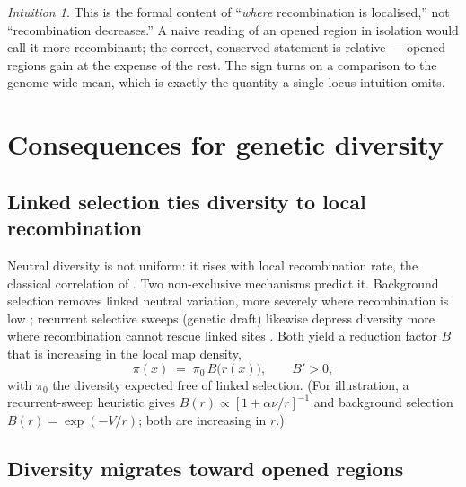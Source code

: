 \documentclass[11pt]{article}
\theoremstyle{remark}
\newtheorem*{remark}{Intuition}
\begin{document}
\begin{remark}
This is the formal content of ``\emph{where} recombination is localised,'' not
``recombination decreases.'' A naive reading of an opened region in isolation
would call it more recombinant; the correct, conserved statement is relative ---
opened regions gain at the expense of the rest. The sign turns on a comparison to
the genome-wide mean, which is exactly the quantity a single-locus intuition
omits.
\end{remark}

\section{Consequences for genetic diversity}
\label{sec:diversity}

\subsection{Linked selection ties diversity to local recombination}

Neutral diversity is not uniform: it rises with local recombination rate, the
classical correlation of \citet{begun1992}. Two non-exclusive mechanisms predict
it. Background selection removes linked neutral variation, more severely where
recombination is low \citep{charlesworth1993,hudson1995,nordborg1996}; recurrent
selective sweeps (genetic draft) likewise depress diversity more where
recombination cannot rescue linked sites \citep{maynard1974,stephan1992}. Both
yield a reduction factor $B$ that is increasing in the local map density,
\begin{equation}
\pi(x) \;=\; \pi_0\, B\!\big(r(x)\big), \qquad B' > 0,
\label{eq:pi}
\end{equation}
with $\pi_0$ the diversity expected free of linked selection. (For illustration,
a recurrent-sweep heuristic gives $B(r)\!\propto\![1+\alpha\nu/r]^{-1}$ and
background selection $B(r)=\exp(-V/r)$; both are increasing in $r$.)

\subsection{Diversity migrates toward opened regions}
\end{document}
